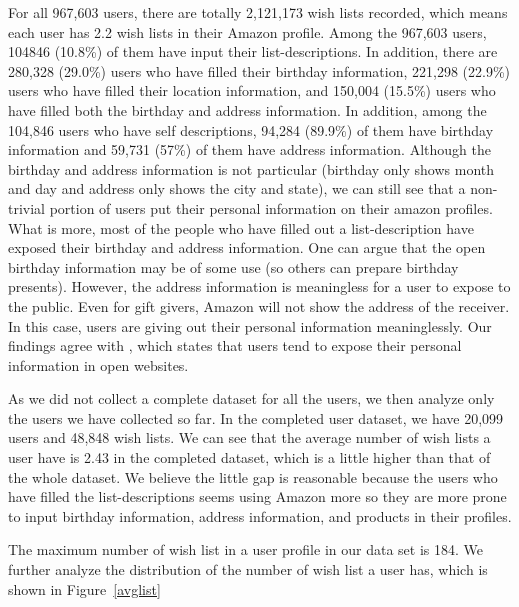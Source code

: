 \documentclass{llncs}
\begin{document}
For all 967,603 users, there are totally 2,121,173 wish lists recorded, which means each user has 2.2 wish lists in their Amazon profile. Among the 967,603 users, 104846 (10.8\%) of them have input their list-descriptions. In addition, there are 280,328 (29.0\%) users who have filled their birthday information, 221,298 (22.9\%) users who have filled their location information, and 150,004 (15.5\%) users who have filled both the birthday and address information. In addition, among the 104,846 users who have self descriptions, 94,284 (89.9\%) of them have birthday information and 59,731 (57\%) of them have address information. Although the birthday and address information is not particular (birthday only shows month and day and address only shows the city and state), we can still see that a non-trivial portion of users put their personal information on their amazon profiles. What is more, most of the people who have filled out a list-description have exposed their birthday and address information. One can argue that the open birthday information may be of some use (so others can prepare birthday presents). However, the address information is meaningless for a user to expose to the public. Even for gift givers, Amazon will not show the address of the receiver. In this case, users are giving out their personal information meaninglessly. Our findings agree with \cite{frankowski2006you}, which states that users tend to expose their personal information in open websites. 

As we did not collect a complete dataset for all the users, we then analyze only the users we have collected so far. In the completed user dataset, we have 20,099 users and 48,848 wish lists. We can see that the average number of wish lists a user have is 2.43 in the completed dataset, which is a little higher than that of the whole dataset. We believe the little gap is reasonable because the users who have filled the list-descriptions seems using Amazon more so they are more prone to input birthday information, address information, and products in their profiles. 

The maximum number of wish list in a user profile in our data set is 184. We further analyze the distribution of the number of wish list a user has, which is shown in Figure~\ref{avglist}
\end{document}
